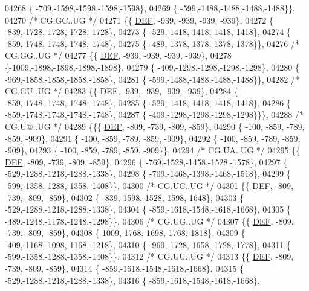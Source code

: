 \begin{DoxyCode}
04268 \{ -709,-1598,-1598,-1598,-1598\},
04269 \{ -599,-1488,-1488,-1488,-1488\}\},
04270 \textcolor{comment}{/* CG.GC..UG */}
04271 \{\{  \mbox{\hyperlink{1_88_84__epars_8h_a397419fc12b37ed479c8abb9d444d843}{DEF}}, -939, -939, -939, -939\},
04272 \{ -839,-1728,-1728,-1728,-1728\},
04273 \{ -529,-1418,-1418,-1418,-1418\},
04274 \{ -859,-1748,-1748,-1748,-1748\},
04275 \{ -489,-1378,-1378,-1378,-1378\}\},
04276 \textcolor{comment}{/* CG.GG..UG */}
04277 \{\{  \mbox{\hyperlink{1_88_84__epars_8h_a397419fc12b37ed479c8abb9d444d843}{DEF}}, -939, -939, -939, -939\},
04278 \{-1009,-1898,-1898,-1898,-1898\},
04279 \{ -409,-1298,-1298,-1298,-1298\},
04280 \{ -969,-1858,-1858,-1858,-1858\},
04281 \{ -599,-1488,-1488,-1488,-1488\}\},
04282 \textcolor{comment}{/* CG.GU..UG */}
04283 \{\{  \mbox{\hyperlink{1_88_84__epars_8h_a397419fc12b37ed479c8abb9d444d843}{DEF}}, -939, -939, -939, -939\},
04284 \{ -859,-1748,-1748,-1748,-1748\},
04285 \{ -529,-1418,-1418,-1418,-1418\},
04286 \{ -859,-1748,-1748,-1748,-1748\},
04287 \{ -409,-1298,-1298,-1298,-1298\}\}\},
04288 \textcolor{comment}{/* CG.U@..UG */}
04289 \{\{\{  \mbox{\hyperlink{1_88_84__epars_8h_a397419fc12b37ed479c8abb9d444d843}{DEF}}, -809, -739, -809, -859\},
04290 \{ -100, -859, -789, -859, -909\},
04291 \{ -100, -859, -789, -859, -909\},
04292 \{ -100, -859, -789, -859, -909\},
04293 \{ -100, -859, -789, -859, -909\}\},
04294 \textcolor{comment}{/* CG.UA..UG */}
04295 \{\{  \mbox{\hyperlink{1_88_84__epars_8h_a397419fc12b37ed479c8abb9d444d843}{DEF}}, -809, -739, -809, -859\},
04296 \{ -769,-1528,-1458,-1528,-1578\},
04297 \{ -529,-1288,-1218,-1288,-1338\},
04298 \{ -709,-1468,-1398,-1468,-1518\},
04299 \{ -599,-1358,-1288,-1358,-1408\}\},
04300 \textcolor{comment}{/* CG.UC..UG */}
04301 \{\{  \mbox{\hyperlink{1_88_84__epars_8h_a397419fc12b37ed479c8abb9d444d843}{DEF}}, -809, -739, -809, -859\},
04302 \{ -839,-1598,-1528,-1598,-1648\},
04303 \{ -529,-1288,-1218,-1288,-1338\},
04304 \{ -859,-1618,-1548,-1618,-1668\},
04305 \{ -489,-1248,-1178,-1248,-1298\}\},
04306 \textcolor{comment}{/* CG.UG..UG */}
04307 \{\{  \mbox{\hyperlink{1_88_84__epars_8h_a397419fc12b37ed479c8abb9d444d843}{DEF}}, -809, -739, -809, -859\},
04308 \{-1009,-1768,-1698,-1768,-1818\},
04309 \{ -409,-1168,-1098,-1168,-1218\},
04310 \{ -969,-1728,-1658,-1728,-1778\},
04311 \{ -599,-1358,-1288,-1358,-1408\}\},
04312 \textcolor{comment}{/* CG.UU..UG */}
04313 \{\{  \mbox{\hyperlink{1_88_84__epars_8h_a397419fc12b37ed479c8abb9d444d843}{DEF}}, -809, -739, -809, -859\},
04314 \{ -859,-1618,-1548,-1618,-1668\},
04315 \{ -529,-1288,-1218,-1288,-1338\},
04316 \{ -859,-1618,-1548,-1618,-1668\},

\end{DoxyCode}
